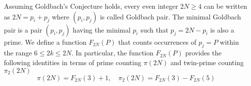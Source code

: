 Assuming Goldbach's Conjecture holds, every even integer $2N \geq 4 $ can be written as $2N = p_i + p_j$
where $(p_i, p_j)$ is called Goldbach pair.
The minimal Goldbach pair is a pair $(p_i,p_j)$ having the minimal $p_i$ such that $p_j = 2N - p_i$ is also a prime.
We define a function $F_{2N}(P)$ that counts occurrences of $p_j = P$ within the range $6 \leq 2k \leq 2N$.
In particular, the function $F_{2N}(P)$ provides the following identities in terms of prime counting $\pi(2N)$ and
twin-prime counting $\pi_2(2N)$
\[
    \pi(2N) = F_{2N}(3) + 1, \quad \pi_2(2N) = F_{2N}(3) - F_{2N}(5)
\]

